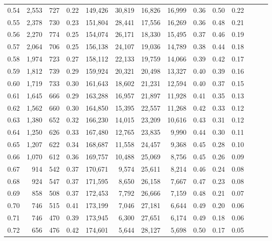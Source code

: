 \begin{tabular}{rrrrrrrrrrrrrr}
0.54 &  2,553 &  727 &  0.22 &  149,426 &   30,819 &  16,826 &  16,999 &  0.36 &  0.50 &      0.22 \\
0.55 &  2,378 &  730 &  0.23 &  151,804 &   28,441 &  17,556 &  16,269 &  0.36 &  0.48 &      0.21 \\
0.56 &  2,270 &  774 &  0.25 &  154,074 &   26,171 &  18,330 &  15,495 &  0.37 &  0.46 &      0.19 \\
0.57 &  2,064 &  706 &  0.25 &  156,138 &   24,107 &  19,036 &  14,789 &  0.38 &  0.44 &      0.18 \\
0.58 &  1,974 &  723 &  0.27 &  158,112 &   22,133 &  19,759 &  14,066 &  0.39 &  0.42 &      0.17 \\
0.59 &  1,812 &  739 &  0.29 &  159,924 &   20,321 &  20,498 &  13,327 &  0.40 &  0.39 &      0.16 \\
0.60 &  1,719 &  733 &  0.30 &  161,643 &   18,602 &  21,231 &  12,594 &  0.40 &  0.37 &      0.15 \\
0.61 &  1,645 &  666 &  0.29 &  163,288 &   16,957 &  21,897 &  11,928 &  0.41 &  0.35 &      0.13 \\
0.62 &  1,562 &  660 &  0.30 &  164,850 &   15,395 &  22,557 &  11,268 &  0.42 &  0.33 &      0.12 \\
0.63 &  1,380 &  652 &  0.32 &  166,230 &   14,015 &  23,209 &  10,616 &  0.43 &  0.31 &      0.12 \\
0.64 &  1,250 &  626 &  0.33 &  167,480 &   12,765 &  23,835 &   9,990 &  0.44 &  0.30 &      0.11 \\
0.65 &  1,207 &  622 &  0.34 &  168,687 &   11,558 &  24,457 &   9,368 &  0.45 &  0.28 &      0.10 \\
0.66 &  1,070 &  612 &  0.36 &  169,757 &   10,488 &  25,069 &   8,756 &  0.45 &  0.26 &      0.09 \\
0.67 &    914 &  542 &  0.37 &  170,671 &    9,574 &  25,611 &   8,214 &  0.46 &  0.24 &      0.08 \\
0.68 &    924 &  547 &  0.37 &  171,595 &    8,650 &  26,158 &   7,667 &  0.47 &  0.23 &      0.08 \\
0.69 &    858 &  508 &  0.37 &  172,453 &    7,792 &  26,666 &   7,159 &  0.48 &  0.21 &      0.07 \\
0.70 &    746 &  515 &  0.41 &  173,199 &    7,046 &  27,181 &   6,644 &  0.49 &  0.20 &      0.06 \\
0.71 &    746 &  470 &  0.39 &  173,945 &    6,300 &  27,651 &   6,174 &  0.49 &  0.18 &      0.06 \\
0.72 &    656 &  476 &  0.42 &  174,601 &    5,644 &  28,127 &   5,698 &  0.50 &  0.17 &      0.05 \\

\end{tabular}
